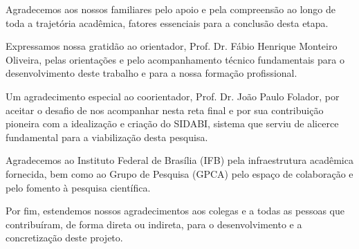 
\begin{agradecimentos}
[AGRADECIMENTOS]

Agradecemos aos nossos familiares pelo apoio e pela compreensão ao longo de toda a trajetória acadêmica, fatores essenciais para a conclusão desta etapa.

Expressamos nossa gratidão ao orientador, Prof. Dr. Fábio Henrique Monteiro Oliveira, pelas orientações e pelo acompanhamento técnico fundamentais para o desenvolvimento deste trabalho e para a nossa formação profissional.

Um agradecimento especial ao coorientador, Prof. Dr. João Paulo Folador, por aceitar o desafio de nos acompanhar nesta reta final e por sua contribuição pioneira com a idealização e criação do SIDABI, sistema que serviu de alicerce fundamental para a viabilização desta pesquisa.

Agradecemos ao Instituto Federal de Brasília (IFB) pela infraestrutura acadêmica fornecida, bem como ao Grupo de Pesquisa (GPCA) pelo espaço de colaboração e pelo fomento à pesquisa científica.

Por fim, estendemos nossos agradecimentos aos colegas e a todas as pessoas que contribuíram, de forma direta ou indireta, para o desenvolvimento e a concretização deste projeto.

\end{agradecimentos}
